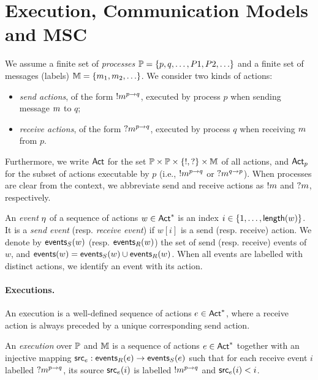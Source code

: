 \section{Execution, Communication Models and MSC}
We assume a finite set of \emph{processes} 
$\mathbb{P}=\{p,q,\ldots,P1,P2,\ldots\}$ and a finite set of 
messages (labels) $\mathbb{M}=\{m_1,m_2,\ldots\}$.  
We consider two kinds of actions:  
\begin{itemize}
	\item \emph{send actions}, of the form $!m^{p\to q}$, 
	executed by process $p$ when sending message $m$ to $q$;  
	\item \emph{receive actions}, of the form $?m^{p\to q}$, 
	executed by process $q$ when receiving $m$ from $p$.  
\end{itemize}

Furthermore, we write $\mathsf{Act}$ for the set $\mathbb{P} \times \mathbb{P} \times \{!,?\} \times \mathbb{M}$  
of all actions, and $\mathsf{Act}_{p}$ for the subset of actions executable by $p$ 
(i.e., $!m^{p\to q}$ or $?m^{q\to p}$).  
When processes are clear from the context, we abbreviate 
send and receive actions as $!m$ and $?m$, respectively.  

An \emph{event} $\eta$ of a sequence of actions $w \in \mathsf{Act}^*$  
is an index $i \in \{1,\ldots,\mathsf{length}(w)\}$.  
It is a \emph{send event} (resp. \emph{receive event}) if $w[i]$  
is a send (resp. receive) action.  
We denote by $\mathsf{events}_S(w)$ (resp. $\mathsf{events}_R(w)$)  
the set of send (resp. receive) events of $w$, and  
$\mathsf{events}(w) = \mathsf{events}_S(w) \cup \mathsf{events}_R(w)$.  
When all events are labelled with distinct actions, 
we identify an event with its action.  

\paragraph{Executions.}
An execution is a well-defined sequence of actions $e\in\mathsf{Act}^*$, where a
receive action is always preceded by a unique corresponding send action. %

\bigskip

\begin{definition}[Execution]\label{def:execution}
An \emph{execution} over $\mathbb{P}$ and $\mathbb{M}$ is a sequence 
of actions $e \in \mathsf{Act}^*$ together with an injective mapping 
$\mathsf{src}_{e} : \mathsf{events}_R(e) \to \mathsf{events}_S(e)$  
such that for each receive event $i$ labelled $?m^{p\to q}$,  
its source $\mathsf{src}_{e}(i)$ is labelled $!m^{p\to q}$ and  
$\mathsf{src}_{e}(i) < i$.  
\end{definition}

